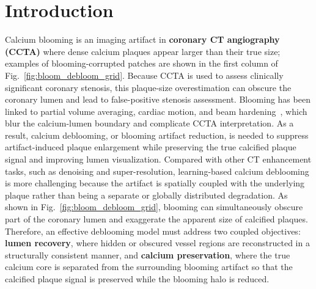 \documentclass[singleLetter,times]{sagej}
\begin{document}

\maketitle

\section{Introduction}
\label{sec:introduction}

Calcium blooming is an imaging artifact in \textbf{coronary CT angiography (CCTA)} where dense calcium plaques appear larger than their true size; examples of blooming-corrupted patches are shown in the first column of Fig.~\ref{fig:bloom_debloom_grid}. Because CCTA is used to assess clinically significant coronary stenosis, this plaque-size overestimation can obscure the coronary lumen and lead to false-positive stenosis assessment. Blooming has been linked to partial volume averaging, cardiac motion, and beam hardening~\cite{pack_blooming}, which blur the calcium-lumen boundary and complicate CCTA interpretation. As a result, calcium deblooming, or blooming artifact reduction, is needed to suppress artifact-induced plaque enlargement while preserving the true calcified plaque signal and improving lumen visualization.
Compared with other CT enhancement tasks, such as denoising and super-resolution, learning-based calcium deblooming is more challenging because the artifact is spatially coupled with the underlying plaque rather than being a separate or globally distributed degradation. As shown in Fig.~\ref{fig:bloom_debloom_grid}, blooming can simultaneously obscure part of the coronary lumen and exaggerate the apparent size of calcified plaques. Therefore, an effective deblooming model must address two coupled objectives: \textbf{lumen recovery}, where hidden or obscured vessel regions are reconstructed in a structurally consistent manner, and \textbf{calcium preservation}, where the true calcium core is separated from the surrounding blooming artifact so that the calcified plaque signal is preserved while the blooming halo is reduced.
\end{document}
